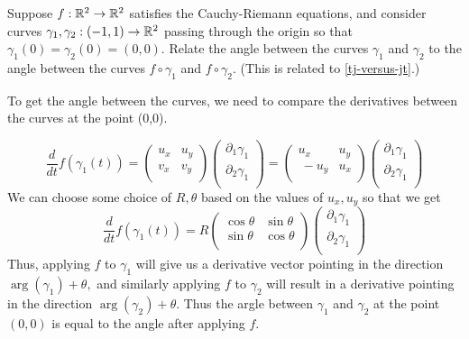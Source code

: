 \documentclass{homework}
\begin{document}
\begin{problem}
  Suppose $f : \mathbb{R}^2 \to \mathbb{R}^2$ satisfies the Cauchy-Riemann equations,
  and consider curves $\gamma_1, \gamma_2 : (-1,1) \to \mathbb{R}^2$ passing
  through the origin so that $\gamma_1(0) = \gamma_2(0) = (0,0)$.
  Relate the angle between the curves $\gamma_1$ and $\gamma_2$ to the
  angle between the curves $f \circ \gamma_1$ and $f \circ \gamma_2$.
  (This is related to \ref{tj-versus-jt}.)
\end{problem}
\begin{solution}
To get the angle between the curves, we need to compare the derivatives between the curves at the point (0,0).

\[\frac{d}{dt} f(\gamma_1(t)) = 
\begin{pmatrix}
u_x &u_y\\
v_x &v_y\\
\end{pmatrix}
\begin{pmatrix}
\partial_1\gamma_1\\
\partial_2\gamma_1\\
\end{pmatrix}
= 
\begin{pmatrix}
u_x & u_y\\\
-u_y & u_x\\
\end{pmatrix}
\begin{pmatrix}
\partial_1\gamma_1\\
\partial_2\gamma_1\\
\end{pmatrix}\]
We can choose some choice of $R, \theta$ based on the values of $u_x, u_y$ so that we get
\[\frac{d}{dt} f(\gamma_1(t)) = 
R
\begin{pmatrix}
\cos{\theta} & \sin{\theta}\\
\sin{\theta} & \cos{\theta}\\
\end{pmatrix}
\begin{pmatrix}
\partial_1\gamma_1\\
\partial_2\gamma_1\\
\end{pmatrix}
\]
Thus, applying $f$ to $\gamma_1$ will give us a derivative vector pointing in the direction $\arg(\gamma_1) + \theta,$ and similarly applying $f$ to $\gamma_2$ will result in a derivative pointing in the direction $\arg(\gamma_2)+\theta$. Thus the argle between $\gamma_1$ and $\gamma_2$ at the point $(0,0)$ is equal to the angle after applying $f$.
\end{solution}
\end{document}
